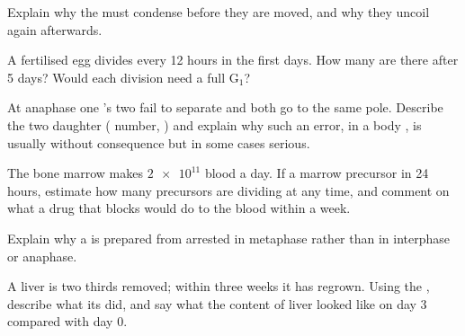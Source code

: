 \begin{exercise}[$\star\star$]\label{exo:g11:cell-cycle-mitosis:10}
Explain why the  must condense before they are moved, and
why they uncoil again afterwards.
\end{exercise}

\begin{exercise}[$\star\star$]\label{exo:g11:cell-cycle-mitosis:11}
A fertilised egg divides every 12 hours in the first days. How many
 are there after 5 days? Would each division need a full
$\mathrm{G_1}$?
\end{exercise}

\begin{exercise}[$\star\star\star$]\label{exo:g11:cell-cycle-mitosis:12}
At anaphase one 's two  fail to separate and both
go to the same pole. Describe the two daughter  (
number, ) and explain why such an error, in a body , is usually
without consequence but in some cases serious.
\end{exercise}

\begin{exercise}[$\star\star\star$]\label{exo:g11:cell-cycle-mitosis:13}
The bone marrow makes $\num{2e11}$ blood  a day. If a marrow
precursor  in 24 hours, estimate how many precursors are
dividing at any time, and comment on what a drug that blocks 
would do to the blood within a week.
\end{exercise}

\begin{exercise}[$\star\star\star$]\label{exo:g11:cell-cycle-mitosis:14}
Explain why a  is prepared from  arrested in metaphase
rather than in interphase or anaphase.
\end{exercise}

\begin{exercise}[$\star\star\star$]\label{exo:g11:cell-cycle-mitosis:15}
A liver is two thirds removed; within three weeks it has regrown. Using
the , describe what its  did, and say what the 
content of liver  looked like on day 3 compared with day 0.
\end{exercise}

